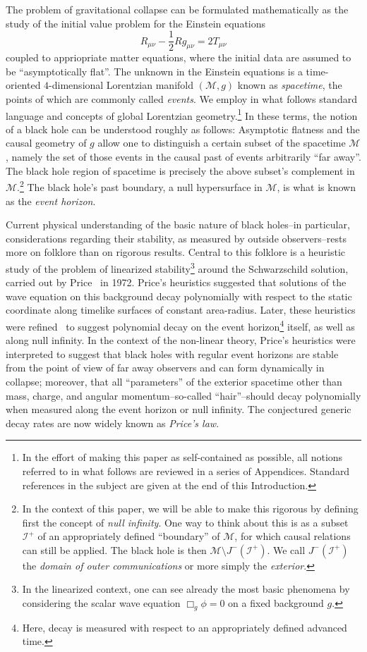 \documentclass{article}
\begin{document}
The problem of gravitational collapse
can be formulated mathematically 
as the study of the initial value problem for
the Einstein equations
\[
R_{\mu\nu}-\frac12Rg_{\mu\nu}=2T_{\mu\nu}
\]
coupled to appriopriate matter equations,
where the initial data are assumed to be ``asymptotically flat''.
The unknown in the Einstein equations is a time-oriented $4$-dimensional
Lorentzian manifold $(\mathcal{M},g)$ known as \emph{spacetime},
the points of which are commonly called \emph{events}. 
We employ in what follows standard language and concepts of global Lorentzian 
geometry.\footnote{In the effort of
making this paper as self-contained as possible, 
all notions referred to in what follows are reviewed in a series
of Appendices. Standard references in the subject are
given at the end of this Introduction.}
In these terms, the notion of a black hole can be understood roughly as follows:
Asymptotic flatness and the causal geometry of $g$ allow 
one to distinguish a certain subset of the spacetime $\mathcal{M}$,
namely the set of those events in the causal past of events 
arbitrarily ``far away''.
The black hole region of spacetime is precisely the above
subset's complement in $\mathcal{M}$.\footnote{In the context of this paper, we will be able
to make this rigorous by defining first the concept of \emph{null infinity}.
One way to think about this is as a subset $\mathcal{I}^+$
of an appropriately defined ``boundary'' 
of $\mathcal{M}$, for which causal relations can still be applied.
The black hole is then $\mathcal{M}\setminus J^{-}(\mathcal{I}^+)$.
We call $J^-(\mathcal{I^+})$ the \emph{domain of outer communications} or
more simply the \emph{exterior}.}  The black hole's past boundary, a null
hypersurface in $\mathcal{M}$, is what is known as the \emph{event horizon}.


Current physical understanding of the basic nature of 
black holes--in particular, considerations regarding their stability,
as measured by outside observers--rests 
more on folklore than on rigorous results. Central to this folklore
is a heuristic study of the problem of linearized stability\footnote{In
the linearized context, one can
see already the most basic phenomena by considering the scalar wave equation
$\Box_g\phi=0$ on a fixed background $g$.} around
the Schwarzschild solution, 
carried out by Price~\cite{rpr:ns} in 1972. 
Price's heuristics suggested that solutions of the wave equation on this background
decay polynomially with respect to the static coordinate along timelike surfaces 
of constant area-radius. Later, these heuristics 
were refined~\cite{gpp:de1} to suggest 
polynomial decay on the event horizon\footnote{Here, decay is measured
with respect to an appropriately defined advanced time.} itself,
as well as along null infinity. In the context of the non-linear theory,
Price's heuristics were interpreted to suggest
that black holes with regular event horizons are stable from the point
of view of far away observers and
can form dynamically in collapse; moreover, that all ``parameters'' of 
the exterior spacetime 
other than mass, charge, and angular 
momentum--so-called ``hair''--should
decay polynomially when measured along the event horizon or null infinity. 
The conjectured generic decay rates are now widely known as \emph{Price's law}.
\end{document}
